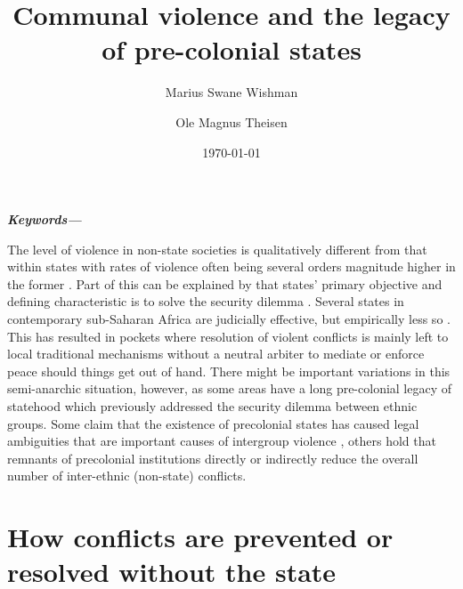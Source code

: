 \documentclass[12pt]{article}
\title{Communal violence and the legacy of pre-colonial states}
\author[$\dagger$]{Marius Swane Wishman}
\author[$\ddagger$]{Ole Magnus Theisen}
\affil[$\dagger,\ddagger$]{Department of Sociology and Political Science, NTNU}
\date{\today}
\providecommand{\keywords}[1]
{
	\small	
	\textbf{\textit{Keywords---}} #1
}
\begin{document}
\maketitle

\begin{abstract}
\end{abstract}

\keywords{}

\pagebreak

\onehalfspacing

The level of violence in non-state societies is qualitatively different from
that within states with rates of violence often being several orders magnitude
higher in the former \citep{diamond2013world, LeBlanc2003, Pinker2012}. Part of
this can be explained by that states’ primary objective and defining
characteristic is to solve the security dilemma \citep{Hobbes, Lake_1996}.
Several states in contemporary sub-Saharan Africa are judicially effective, but
empirically less so \citep{Jackson_1982}. This has resulted in pockets where
resolution of violent conflicts is mainly left to local traditional mechanisms
without a neutral arbiter to mediate or enforce peace should things get out of
hand. There might be important variations in this semi-anarchic situation,
however, as some areas have a long pre-colonial legacy of statehood which
previously addressed the security dilemma between ethnic groups. Some claim that
the existence of precolonial states has caused legal ambiguities that are
important causes of intergroup violence \citep{Eck2014}, others hold that
remnants of precolonial institutions directly \citep{Herbst2014, Wig2018} or
indirectly reduce the overall number of inter-ethnic (non-state) conflicts. 

\section{How conflicts are prevented or resolved without the state}
\end{document}
